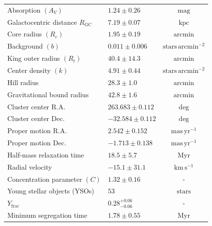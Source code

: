 \documentclass{aa}
\begin{document}
\begin{table}
{\begin{tabular}{llc}
			Absorption $(A_V)$                      & $1.24 \pm 0.26$   & $\mathrm{mag}$                     \\
				Galactocentric distance $R_\mathrm{GC}$ & $7.19 \pm 0.07$             & $\mathrm{kpc}$                     \\
			Core radius $(R_c)$                     & $1.95 \pm 0.19$  & $\mathrm{arcmin}$                  \\
			Background $(b)$                        & $0.011 \pm 0.006$  & $\mathrm{stars\,arcmin^{-2}}$      \\
			King outer radius $(R_t)$               & $40.4 \pm 14.3$ & $\mathrm{arcmin}$                  \\
			Center density $(k)$                    & $4.91 \pm 0.44$   & $\mathrm{stars\,arcmin^{-2}}$      \\
			Hill radius                             & $28.3 \pm 1.0$            & $\mathrm{arcmin}$                  \\
			Gravitational bound radius              & $42.8 \pm 1.6$            & $\mathrm{arcmin}$                  \\
			Cluster center R.A.                     & $263.683 \pm 0.112$ & $\mathrm{deg}$                     \\
			Cluster center Dec.                     & $-32.584 \pm 0.112$ & $\mathrm{deg}$                     \\
				Proper motion R.A.                      & $2.542 \pm 0.152$  & $\mathrm{mas\,yr^{-1}}$            \\
				Proper motion Dec.                      & $-1.713 \pm 0.138$ & $\mathrm{mas\,yr^{-1}}$            \\
			Half-mass relaxation time               & $18.5 \pm 5.7$             & $\mathrm{Myr}$                     \\
			Radial velocity                         & $-15.1 \pm 31.1$  & $\mathrm{km\,s^{-1}}$              \\
			Concentration parameter $(C)$           & $1.32 \pm 0.16$    & -                                  \\
			Young stellar objects (YSOs)            & $53$                & $\mathrm{stars}$                   \\
			$Y_{\text{frac}}$                       & $0.28^{+0.06}_{-0.06}$              & -                                  \\
			Minimum segregation time                & $1.78 \pm 0.55$             & $\mathrm{Myr}$                     \\ \hline
		\end{tabular}%
	}
	\label{tab:ngc6383_results}
\end{table}
\end{document}

